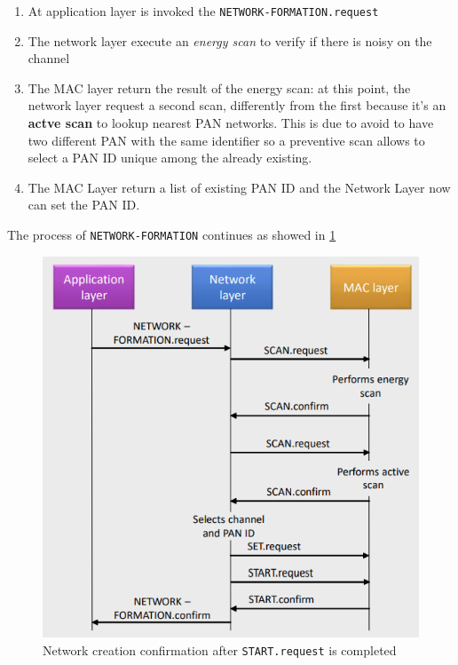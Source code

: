\documentclass[10pt,a4paper]{report}
\theoremstyle{definition}
\begin{document}
\begin{enumerate}
	\item 
	At application layer is invoked the \texttt{NETWORK-FORMATION.request}
	\item 
	The network layer execute an \textit{energy scan} to verify if there is noisy on the channel
	\item 
	The MAC layer return the result of the energy scan: at this point, the network layer request a second scan, differently from the first because it's an \textbf{actve scan} to lookup nearest PAN networks. This is due to avoid to have two different PAN with the same identifier so a preventive scan allows to select a PAN ID unique among the already existing.
	\item 
	The MAC Layer return a list of existing PAN ID and the Network Layer now can set the PAN ID.
	
\end{enumerate}
The process of \texttt{NETWORK-FORMATION} continues as showed in \ref{network-formation2}
\begin{figure}[h]
	\centering\includegraphics[scale=0.40]{images/Pasted image 20230311121418.png}
	\caption{Network creation confirmation after \texttt{START.request} is completed}
	\label{network-formation2}
\end{figure}
\end{document}
